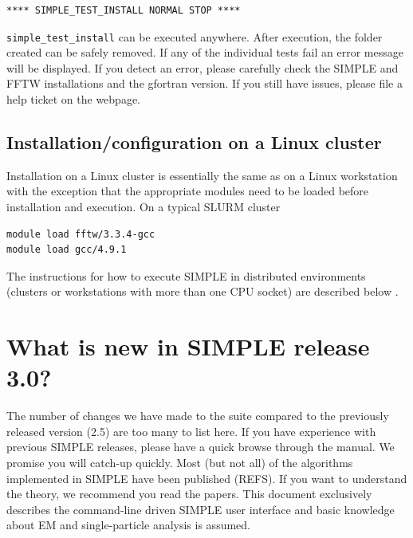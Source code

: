\documentclass[a4paper,11pt]{article}
\begin{document}
\begin{Verbatim}[commandchars=+\[\],fontsize=\small,breaklines=true]
 **** SIMPLE_TEST_INSTALL NORMAL STOP ****
\end{Verbatim}

\noindent{}\texttt{simple\_test\_install} can be executed anywhere. After execution, the folder created can be safely removed. If any of the individual 
tests fail an error message will be displayed. If you detect an error, please carefully check the SIMPLE and FFTW installations 
and the gfortran version. If you still have issues, please file a help ticket on the webpage.

\subsection{Installation/configuration on a Linux cluster}

Installation on a Linux cluster is essentially the same as on a Linux workstation with the exception that the appropriate modules need to be loaded before installation and execution. On a typical SLURM cluster
\begin{Verbatim}[commandchars=+\[\],fontsize=\small,breaklines=true]
module load fftw/3.3.4-gcc
module load gcc/4.9.1
\end{Verbatim}
The instructions for how to execute SIMPLE in distributed environments (clusters or workstations with more than one CPU socket) are described below \label{distr}.

\section{What is new in SIMPLE release 3.0?}
The number of changes we have made to the suite compared to the previously released version (2.5) are too many to list here. If you have experience with previous SIMPLE releases, please have a quick browse through the manual. We promise you will catch-up quickly. Most (but not all) of the algorithms implemented in SIMPLE have been published (REFS). If you want to understand the theory, we recommend you read the papers. This document exclusively describes the command-line driven SIMPLE user interface and basic knowledge about EM and single-particle analysis is assumed. 
\end{document}
